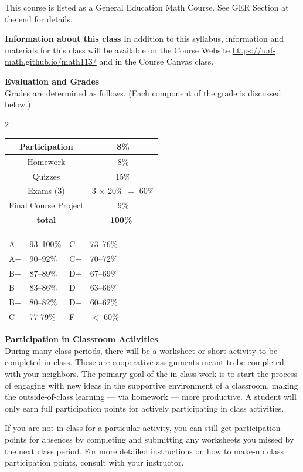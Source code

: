 \documentclass[11pt]{article}
\renewcommand{\emph}[1]{\textsf{\textbf{#1}}}
\newcommand{\localhead}[1]{\par\smallskip\textbf{#1} \smallskip\nobreak\\}%
\def\heading#1{\localhead{\large\emph{#1}}}
\begin{document}
 This course is listed as a General Education Math Course. See GER Section at the end for details. 
 
\emph{\large{Information about this class}} In addition to this syllabus, information and materials for this class will be available on the Course Website \url{https://uaf-math.github.io/math113/} and in the Course Canvas class.

\heading{Evaluation and Grades}
Grades are determined as follows.  (Each component of the grade is discussed below.)
 
\begin{multicols}{2}
\begin{tabular}{|c|c|}
\hline
Participation & 8\%\\
\hline
Homework & 8\% \\
\hline
Quizzes & 15\% \\
\hline
 Exams (3) & 3 $\times$ 20\% $=$ 60\% \\
\hline
Final Course Project & 9\% \\
\hline
{\bf total} & {\bf 100\%} \, \\
\hline
\end{tabular}
%
\hspace{1cm}
\begin{tabular}{llll}
A  & 93--100\%& C  & 73--76\%  \\
A$-$ & 90--92\% & C$-$ & 70--72\% \\
B+ & 87--89\% & D+ & 67--69\%  \\
B  & 83--86\% & D  & 63--66\%  \\
B$-$& 80--82\% & D$-$ & 60--62\%  \\
C+ & 77-79\% & F  & $<$ 60\%
\end{tabular}
\end{multicols}

\heading{Participation in Classroom Activities}
During many class periods, there will be a worksheet or short activity
to be completed in class. These are cooperative assignments meant to
be completed with your neighbors. The primary goal of the in-class work is to start the process of engaging with new ideas in the supportive environment of a classroom, making the outside-of-class learning --- via homework --- more productive. A student will only earn full participation points for actively participating in class activities.

If you are not in class for a particular activity, you can still get participation points for absences by completing and submitting any worksheets you missed by the next class period. For more detailed instructions on how to make-up class participation points, consult with your instructor.
\end{document}
